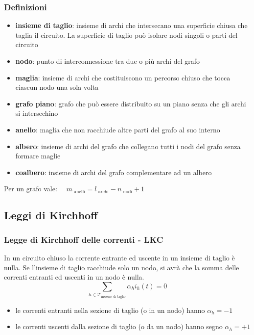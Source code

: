 \documentclass[a4paper]{article}
\begin{document}
\subsubsection*{Definizioni}
\begin{itemize}
	\item \textbf{insieme di taglio}: insieme di archi che intersecano una superficie chiusa che taglia il circuito. La
	superficie di taglio può isolare nodi singoli o parti del circuito
	\item \textbf{nodo}: punto di interconnessione tra due o più archi del grafo
	\item \textbf{maglia}: insieme di archi che costituiscono un percorso chiuso che tocca ciascun nodo una sola volta
	\item \textbf{grafo piano}: grafo che può essere distribuito su un piano senza che gli archi si intersechino
	\item \textbf{anello}: maglia che non racchiude altre parti del grafo al suo interno
	\item \textbf{albero}: insieme di archi del grafo che collegano tutti i nodi del grafo senza formare maglie
	\item \textbf{coalbero}: insieme di archi del grafo complementare ad un albero
\end{itemize}
Per un grafo vale: \(\quad m_\text{ anelli} = l_\text{ archi} - n_\text{ nodi} + 1\)

\subsection{Leggi di Kirchhoff}
\subsubsection*{Legge di Kirchhoff delle correnti - LKC}
In un circuito chiuso la corrente entrante ed uscente in un insieme di taglio è nulla. Se l'insieme di taglio racchiude solo un
nodo, si avrà che la somma delle correnti entranti ed uscenti in un nodo è nulla.
\[\sum_{h \in \mathcal{T}_\text{insieme di taglio}} \alpha_h i_h(t) = 0\]
\begin{itemize}
	\item le correnti entranti nella sezione di taglio (o in un nodo) hanno \(\alpha_h = -1\)
	\item le correnti uscenti dalla sezione di taglio (o da un nodo) hanno segno \(\alpha_h = +1\)
\end{itemize}
\end{document}
